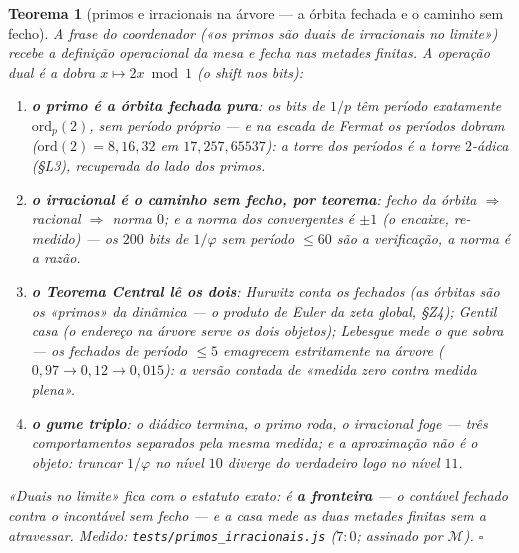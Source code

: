 \documentclass[11pt,a4paper]{article}
\newtheorem{teorema}{Teorema}
\newcommand{\code}[1]{\texttt{\small #1}}
\begin{document}
\begin{teorema}[primos e irracionais na árvore --- a órbita fechada e
o caminho sem fecho]\label{thm:primos-irracionais}
A frase do coordenador («os primos são duais de irracionais no
limite») recebe a definição operacional da mesa e fecha nas metades
finitas. A operação dual é \emph{a dobra} $x\mapsto2x\bmod1$ (o shift
nos bits):
\begin{enumerate}
\item \textbf{o primo é a órbita fechada pura}: os bits de $1/p$ têm
período exatamente $\mathrm{ord}_{p}(2)$, sem período próprio --- e
na escada de Fermat \emph{os períodos dobram}
($\mathrm{ord}(2)=8,16,32$ em $17,257,65537$): a torre dos períodos é
a torre $2$-ádica (\S L3), recuperada do lado dos primos.
\item \textbf{o irracional é o caminho sem fecho, por teorema}:
fecho da órbita $\Rightarrow$ racional $\Rightarrow$ norma $0$; e a
norma dos convergentes é $\pm1$ (o encaixe, re-medido) --- os $200$
bits de $1/\varphi$ sem período $\le60$ são a verificação, a norma é
a razão.
\item \textbf{o Teorema Central lê os dois}: Hurwitz \emph{conta} os
fechados (as órbitas são os «primos» da dinâmica --- o produto de
Euler da zeta global, \S Z4); Gentil \emph{casa} (o endereço na
árvore serve os dois objetos); Lebesgue \emph{mede} o que sobra ---
os fechados de período $\le5$ emagrecem estritamente na árvore
($0{,}97\to0{,}12\to0{,}015$): a versão \emph{contada} de «medida
zero contra medida plena».
\item \textbf{o gume triplo}: o diádico \emph{termina}, o primo
\emph{roda}, o irracional \emph{foge} --- três comportamentos
separados pela mesma medida; e a aproximação \emph{não é o objeto}:
truncar $1/\varphi$ no nível $10$ diverge do verdadeiro logo no nível
$11$.
\end{enumerate}
«Duais \emph{no limite}» fica com o estatuto exato: é \textbf{a
fronteira} --- o contável fechado contra o incontável sem fecho ---
e a casa mede as duas metades finitas sem a atravessar.
\emph{Medido:} \code{tests/primos\_irracionais.js} ($7{:}0$;
assinado por $\mathcal{M}$).
$\square$
\end{teorema}
\end{document}

